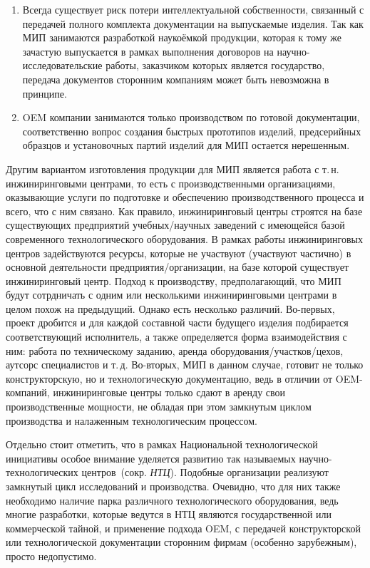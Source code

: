 \begin{enumerate}
	\item Всегда существует риск потери интеллектуальной собственности, связанный с передачей полного комплекта документации на выпускаемые изделия. Так как МИП занимаются разработкой наукоёмкой продукции, которая к тому же зачастую выпускается в рамках выполнения договоров на научно-исследовательские работы, заказчиком которых является государство, передача документов сторонним компаниям может быть невозможна в принципе.
	\item OEM компании занимаются только производством по готовой документации, соответственно вопрос создания быстрых прототипов изделий, предсерийных образцов и установочных партий изделий для МИП остается нерешенным.
\end{enumerate}


Другим вариантом изготовления продукции для МИП является работа с т.\,н. инжиниринговыми центрами, то есть с производственными организациями, оказывающие услуги по подготовке и обеспечению производственного процесса и всего, что с ним связано. Как правило, инжиниринговый центры строятся на базе существующих предприятий учебных/научных заведений с имеющейся базой современного технологического оборудования. В рамках работы инжиниринговых центров задействуются ресурсы, которые не участвуют (участвуют частично) в основной деятельности предприятия/организации, на базе которой существует инжиниринговый центр. Подход к производству, предполагающий, что МИП будут сотрдничать с одним или несколькими инжиниринговыми центрами в целом похож на предыдущий. Однако есть несколько различий. Во-первых, проект дробится и для каждой составной части будущего изделия подбирается соответствующий исполнитель, а также определяется форма взаимодействия с ним: работа по техническому заданию, аренда оборудования/участков/цехов, аутсорс специалистов и т.\,д. Во-вторых, МИП в данном случае, готовит не только конструкторскую, но и технологическую документацию, ведь в отличии от OEM-компаний, инжиниринговые центры только сдают в аренду свои производственные мощности, не обладая при этом замкнутым циклом производства и налаженным технологическим процессом.

Отдельно стоит отметить, что в рамках Национальной технологической инициативы особое внимание уделяется развитию так называемых научно-технологических центров~(сокр. \textit{НТЦ}). Подобные организации реализуют замкнутый цикл исследований и производства. Очевидно, что для них также необходимо наличие парка различного технологического оборудования, ведь многие разработки, которые ведутся в НТЦ являются государственной или коммерческой тайной, и применение подхода OEM, с передачей конструкторской или технологической документации сторонним фирмам (особенно зарубежным), просто недопустимо. 


